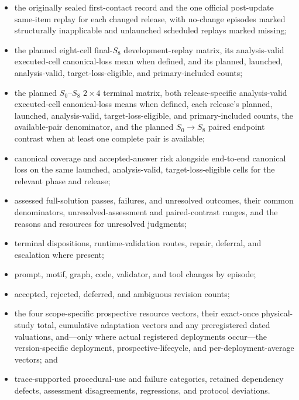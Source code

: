 \documentclass[10pt]{article} %
\providecommand{\1}{\mathbf{1}}  %
\theoremstyle{remark}
\theoremstyle{definition}
\begin{document}
\begin{itemize}

    \item the originally sealed first-contact record and the one official post-update same-item replay for each changed release, with no-change episodes marked structurally inapplicable and unlaunched scheduled replays marked missing;

    \item the planned eight-cell final-$S_8$ development-replay matrix, its analysis-valid executed-cell canonical-loss mean when defined, and its planned, launched, analysis-valid, target-loss-eligible, and primary-included counts;

    \item the planned $S_0$--$S_8$ $2\times4$ terminal matrix, both release-specific analysis-valid executed-cell canonical-loss means when defined, each release's planned, launched, analysis-valid, target-loss-eligible, and primary-included counts, the available-pair denominator, and the planned $S_0\to S_8$ paired endpoint contrast when at least one complete pair is available;

    \item canonical coverage and accepted-answer risk alongside end-to-end
    canonical loss on the same launched, analysis-valid,
    target-loss-eligible cells for the relevant phase and release;

    \item assessed full-solution passes, failures, and unresolved
    outcomes, their common denominators, unresolved-assessment and
    paired-contrast ranges, and the reasons and resources for
    unresolved judgments;

    \item terminal dispositions, runtime-validation routes, repair, deferral, and escalation where present;

    \item prompt, motif, graph, code, validator, and tool changes by episode;

    \item accepted, rejected, deferred, and ambiguous revision counts;

    \item the four scope-specific prospective resource vectors, their exact-once physical-study total, cumulative adaptation vectors and any preregistered dated valuations, and---only where actual registered deployments occur---the version-specific deployment, prospective-lifecycle, and per-deployment-average vectors; and

    \item trace-supported procedural-use and failure categories, retained dependency defects, assessment disagreements, regressions, and protocol deviations.

\end{itemize}
\end{document}
